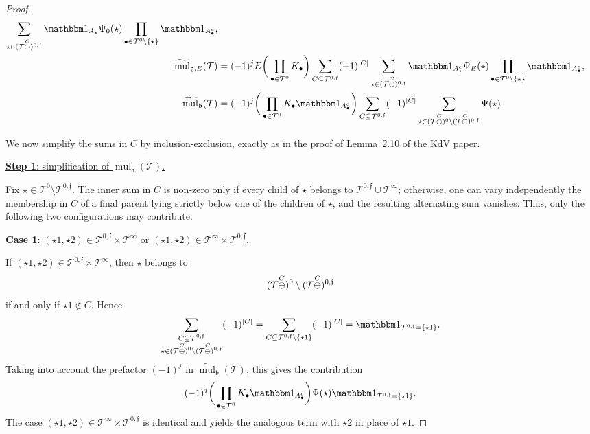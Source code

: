 \documentclass[a4paper,
11pt,  reqno]{amsart}
\makeatletter
\newcommand{\5}{\textup{V}}
\newcommand{\noi}{\noindent}
\newcommand{\ind}{\mathbbm 1}
\newcommand{\wt}{\widetilde}
\theoremstyle{remark}
\newcommand{\bul}{\bullet}
\newcommand{\TT}{\mathcal{T}}
\newcommand{\bfrak}{\mathfrak{b}}
\newcommand{\gfrak}{\mathfrak{g}}
\newcommand{\ff}{\mathfrak{f}}
\DeclareMathOperator{\mul}{mul}
\def\<#1>{\csname MH@symb@#1\endcsname}
\numberwithin{equation}{section}
\numberwithin{theorem}{section}
\makeatother
\begin{document}
\begin{proof}
\begin{align*}
\sum_{\star\in (\TT\overset{C}{\ominus}\<1>)^{0,\ff}}
\ind_{A_\star}\Psi_0(\star)
\prod_{\bul\in \TT^0\setminus\{\star\}}\ind_{A_\bul^c},
\\
\wt{\mul}_{\gfrak,E}(\TT)
&=
(-1)^j E
\bigg(\prod_{\bul\in \TT^0}K_\bul\bigg)
\sum_{C\subseteq \TT^{0,\ff}}(-1)^{|C|}
\sum_{\star\in (\TT\overset{C}{\ominus}\<1>)^{0,\ff}}
\ind_{A_\star^c}\Psi_E(\star)
\prod_{\bul\in \TT^0\setminus\{\star\}}\ind_{A_\bul^c},
\\
\wt{\mul}_{\bfrak}(\TT)
&=
(-1)^j
\bigg(\prod_{\bul\in \TT^0}K_\bul\ind_{A_\bul^c}\bigg)
\sum_{C\subseteq \TT^{0,\ff}}(-1)^{|C|}
\sum_{\star\in (\TT\overset{C}{\ominus}\<1>)^0\setminus (\TT\overset{C}{\ominus}\<1>)^{0,\ff}}
\Psi(\star).
\end{align*}

We now simplify the sums in $C$ by inclusion-exclusion, exactly as in the proof of Lemma~2.10 of the KdV paper.

\smallskip

\noi
\underline{\textbf{Step 1}: simplification of $\wt{\mul}_{\bfrak}(\TT)$.}

Fix $\star\in \TT^0\setminus \TT^{0,\ff}$. The inner sum in $C$ is non-zero only if every child of $\star$ belongs to $\TT^{0,\ff}\cup \TT^\infty$; otherwise, one can vary independently the membership in $C$ of a final parent lying strictly below one of the children of $\star$, and the resulting alternating sum vanishes. Thus, only the following two configurations may contribute.

\smallskip

\noi
\underline{\textbf{Case 1}: $(\star1,\star2)\in \TT^{0,\ff}\times \TT^\infty$ or $(\star1,\star2)\in \TT^\infty\times \TT^{0,\ff}$.}

If $(\star1,\star2)\in \TT^{0,\ff}\times \TT^\infty$, then $\star$ belongs to
\[
(\TT\overset{C}{\ominus}\<1>)^0\setminus (\TT\overset{C}{\ominus}\<1>)^{0,\ff}
\]
if and only if $\star1\notin C$. Hence
\begin{align*}
\sum_{\substack{C\subseteq \TT^{0,\ff}\\ \star\in (\TT\overset{C}{\ominus}\<1>)^0\setminus (\TT\overset{C}{\ominus}\<1>)^{0,\ff}}}
(-1)^{|C|}
=
\sum_{C\subseteq \TT^{0,\ff}\setminus\{\star1\}}(-1)^{|C|}
=
\ind_{\TT^{0,\ff}=\{\star1\}}.
\end{align*}
Taking into account the prefactor $(-1)^j$ in $\wt{\mul}_{\bfrak}(\TT)$, this gives the contribution
\[
(-1)^j
\bigg(\prod_{\bul\in \TT^0}K_\bul\ind_{A_\bul^c}\bigg)
\Psi(\star)\ind_{\TT^{0,\ff}=\{\star1\}}.
\]
The case $(\star1,\star2)\in \TT^\infty\times \TT^{0,\ff}$ is identical and yields the analogous term with $\star2$ in place of $\star1$.


\end{proof}
\end{document}
